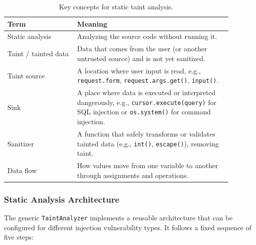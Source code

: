 \begin{table}[H]
  \centering
  \begin{tabular}{p{0.28\linewidth}p{0.62\linewidth}}
    \textbf{Term} & \textbf{Meaning} \\
    \hline
    Static analysis & Analyzing the source code without running it. \\
    Taint / tainted data & Data that comes from the user (or another untrusted source) and is not yet sanitized. \\
    Taint source & A location where user input is read, e.g., \texttt{request.form}, \texttt{request.args.get()}, \texttt{input()}. \\
    Sink & A place where data is executed or interpreted dangerously, e.g., \texttt{cursor.execute(query)} for SQL injection or \texttt{os.system()} for command injection. \\
    Sanitizer & A function that safely transforms or validates tainted data (e.g., \texttt{int()}, \texttt{escape()}), removing taint. \\
    Data flow & How values move from one variable to another through assignments and operations. \\
  \end{tabular}
  \caption{Key concepts for static taint analysis.}
  \label{tab:static_terms}
\end{table}

\subsubsection{Static Analysis Architecture}
\label{sec:static_arch}

The generic \texttt{TaintAnalyzer} implements a reusable architecture that can be configured
for different injection vulnerability types. It follows a fixed sequence of five steps:

